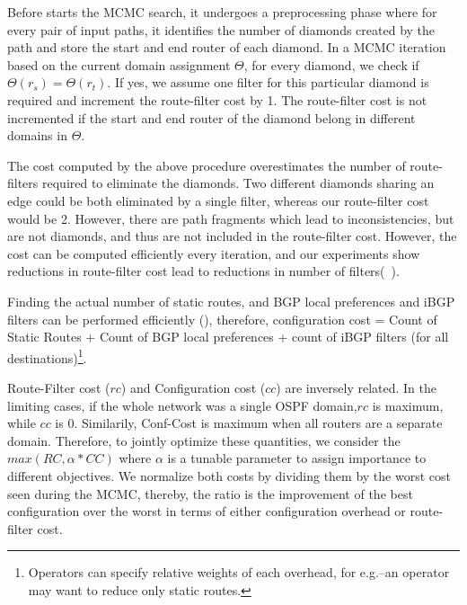 Before \name starts the MCMC search, it undergoes a preprocessing phase 
where for every pair of input paths, it identifies the
number of diamonds created by the path 
and store the start and end router of 
each diamond. In a MCMC iteration based on the current 
domain assignment $\Theta$, for every diamond, we check if 
$\Theta(r_s) = \Theta(r_t)$. If yes, 
we assume one filter for this particular
diamond is required and increment the route-filter cost by 1. The 
route-filter cost is not incremented if the start and end 
router of the diamond belong in different domains in $\Theta$.

The cost computed by the above procedure overestimates the
number of route-filters required to eliminate the diamonds.  
Two different diamonds sharing an edge could be both 
eliminated by a single filter, whereas our route-filter cost 
would be 2. However, there are path fragments which 
lead to inconsistencies, but are not diamonds, and thus
are not included in the route-filter cost. However, the 
cost can be computed efficiently every iteration, and 
our experiments show reductions in route-filter cost 
lead to reductions in number of filters(~). 

Finding the actual number of static routes, and 
BGP local preferences and iBGP filters can be performed 
efficiently (), therefore, 
configuration cost = Count of Static Routes + Count of 
BGP local preferences + count of iBGP filters 
(for all destinations)\footnote{
	Operators can specify relative weights of each overhead, for e.g.--an
	operator may want to reduce only static routes.}.

Route-Filter cost ($rc$) and Configuration cost ($cc$) 
are inversely related. In the limiting cases,
if the whole network was a single OSPF domain,$rc$ is maximum, while
$cc$ is 0. Similarily, Conf-Cost is maximum when all routers are a
separate domain. Therefore, to jointly optimize these quantities, we
consider the $max(RC, \alpha*CC)$ where $\alpha$ is a tunable parameter
to assign importance to different objectives. We normalize
both costs by dividing them by the worst cost seen during the MCMC,
thereby, the ratio is the improvement of the best configuration over
the worst in terms of either configuration overhead or route-filter cost.